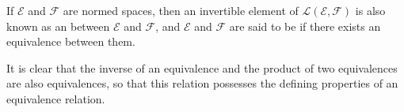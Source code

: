 If $\mathcal{E}$ and $\mathcal{F}$ are normed spaces, then an invertible element of $\mathcal{L}(\mathcal{E}, \mathcal{F})$ is also known as an  between $\mathcal{E}$ and $\mathcal{F}$, and $\mathcal{E}$ and $\mathcal{F}$ are said to be  if there exists an equivalence between them.

It is clear that the inverse of an equivalence and the product of two equivalences are also equivalences, so that this relation possesses the defining properties of an equivalence relation.

